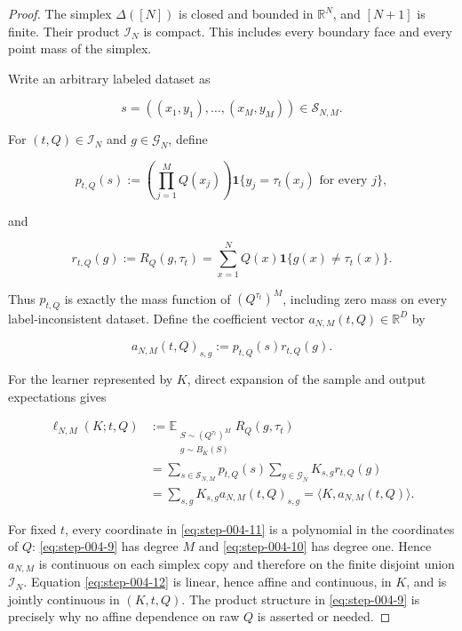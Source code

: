 \begin{proof}
The simplex \(\Delta([N])\) is closed and bounded in \(\mathbb R^N\), and
\([N+1]\) is finite. Their product \(\mathcal I_N\) is compact. This includes
every boundary face and every point mass of the simplex.

Write an arbitrary labeled dataset as

\[
s=((x_1,y_1),\ldots,(x_M,y_M))\in\mathcal S_{N,M}.
\]

For \((t,Q)\in\mathcal I_N\) and \(g\in\mathcal G_N\), define

\[
p_{t,Q}(s)
:=\left(\prod_{j=1}^M Q(x_j)\right)
  \mathbf 1\{y_j=\tau_t(x_j)\text{ for every }j\},
\tag{S4.9}\label{eq:step-004-9}
\]

and

\[
r_{t,Q}(g)
:=R_Q(g,\tau_t)
=\sum_{x=1}^N Q(x)\mathbf 1\{g(x)\ne\tau_t(x)\}.
\tag{S4.10}\label{eq:step-004-10}
\]

Thus \(p_{t,Q}\) is exactly the mass function of
\((Q^{\tau_t})^M\), including zero mass on every label-inconsistent
dataset. Define the coefficient vector \(a_{N,M}(t,Q)\in\mathbb R^D\) by

\[
a_{N,M}(t,Q)_{s,g}:=p_{t,Q}(s)r_{t,Q}(g).
\tag{S4.11}\label{eq:step-004-11}
\]

For the learner represented by \(K\), direct expansion of the sample and
output expectations gives

\[
\begin{aligned}
\ell_{N,M}(K;t,Q)
&:=\mathbb E_{\substack{S\sim(Q^{\tau_t})^M\\g\sim B_K(S)}}
       R_Q(g,\tau_t)\\
&=\sum_{s\in\mathcal S_{N,M}}p_{t,Q}(s)
  \sum_{g\in\mathcal G_N}K_{s,g}r_{t,Q}(g)\\
&=\sum_{s,g}K_{s,g}a_{N,M}(t,Q)_{s,g}
=\langle K,a_{N,M}(t,Q)\rangle.
\end{aligned}
\tag{S4.12}\label{eq:step-004-12}
\]

For fixed \(t\), every coordinate in \eqref{eq:step-004-11} is a polynomial in the coordinates
of \(Q\): \eqref{eq:step-004-9} has degree \(M\) and \eqref{eq:step-004-10} has degree one. Hence
\(a_{N,M}\) is continuous on each simplex copy and therefore on the finite
disjoint union \(\mathcal I_N\). Equation \eqref{eq:step-004-12} is linear, hence affine and
continuous, in \(K\), and is jointly continuous in \((K,t,Q)\). The product
structure in \eqref{eq:step-004-9} is precisely why no affine dependence on raw \(Q\) is
asserted or needed.


\end{proof}
